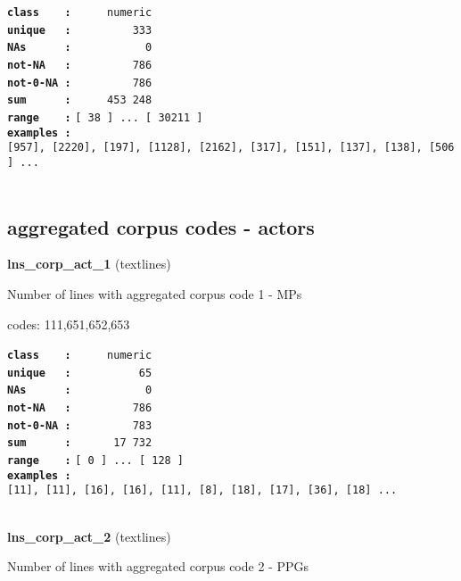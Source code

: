 \documentclass[]{article}
\begin{document}
\textbf{\texttt{class\ \ \ \ :}} \texttt{~~~~~numeric}\\
\textbf{\texttt{unique\ \ \ :}} \texttt{~~~~~~~~~333}\\
\textbf{\texttt{NAs\ \ \ \ \ \ :}} \texttt{~~~~~~~~~~~0}\\
\textbf{\texttt{not-NA\ \ \ :}} \texttt{~~~~~~~~~786}\\
\textbf{\texttt{not-0-NA\ :}} \texttt{~~~~~~~~~786}\\
\textbf{\texttt{sum\ \ \ \ \ \ :}} \texttt{~~~~~453~248}\\
\textbf{\texttt{range\ \ \ \ :}}
\texttt{{[}\ 38\ {]}\ ...\ {[}\ 30211\ {]}}\\
\textbf{\texttt{examples\ :}}
\texttt{{[}957{]},\ {[}2220{]},\ {[}197{]},\ {[}1128{]},\ {[}2162{]},\ {[}317{]},\ {[}151{]},\ {[}137{]},\ {[}138{]},\ {[}506{]}\ ...}\\

~

\subsection{aggregated corpus codes -
actors}\label{aggregated-corpus-codes---actors}

\textbf{lns\_corp\_act\_1} (textlines)

Number of lines with aggregated corpus code 1 - MPs

codes: 111,651,652,653

\textbf{\texttt{class\ \ \ \ :}} \texttt{~~~~~numeric}\\
\textbf{\texttt{unique\ \ \ :}} \texttt{~~~~~~~~~~65}\\
\textbf{\texttt{NAs\ \ \ \ \ \ :}} \texttt{~~~~~~~~~~~0}\\
\textbf{\texttt{not-NA\ \ \ :}} \texttt{~~~~~~~~~786}\\
\textbf{\texttt{not-0-NA\ :}} \texttt{~~~~~~~~~783}\\
\textbf{\texttt{sum\ \ \ \ \ \ :}} \texttt{~~~~~~17~732}\\
\textbf{\texttt{range\ \ \ \ :}}
\texttt{{[}\ 0\ {]}\ ...\ {[}\ 128\ {]}}\\
\textbf{\texttt{examples\ :}}
\texttt{{[}11{]},\ {[}11{]},\ {[}16{]},\ {[}16{]},\ {[}11{]},\ {[}8{]},\ {[}18{]},\ {[}17{]},\ {[}36{]},\ {[}18{]}\ ...}\\

~

\textbf{lns\_corp\_act\_2} (textlines)

Number of lines with aggregated corpus code 2 - PPGs
\end{document}
